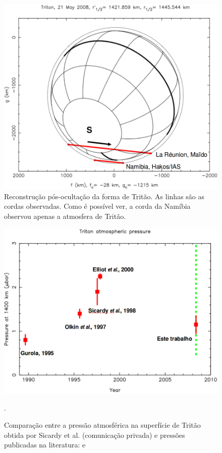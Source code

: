 \documentclass[12pt,a4paper]{monografia}
\begin{document}
\begin{figure}[h]
\begin{centering}
\includegraphics[scale=0.58]{figuras/tritao-2008.png} 
\caption{Reconstrução pós-ocultação da forma de Tritão. As linhas são as cordas observadas. Como é possível ver, a corda da Namíbia observou apenas a atmosfera de Tritão.}
\label{Fig: Tritao-body}
\end{centering}
\end{figure}

\begin{figure}[h]
\begin{centering}
\includegraphics[scale=0.58]{figuras/pressao-2008.png} 
\caption{Comparação entre a pressão atmosférica na superfície de Tritão obtida por Sicardy et al. (comunicação privada) e pressões publicadas na literatura: \cite{Gurola1995, Olkin1997, Sicardy1998} e \cite{Elliot2000}}.
\label{Fig: Tritao-pressao}
\end{centering}
\end{figure}
\end{document}
